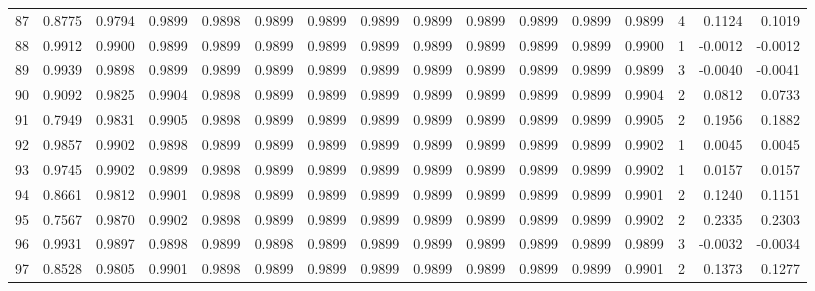 \begin{tabular}{lrrrrrrrrrrrrrrr}
87  &      0.8775 &  0.9794 &  0.9899 &  0.9898 &  0.9899 &  0.9899 &  0.9899 &  0.9899 &  0.9899 &  0.9899 &   0.9899 &     0.9899 &      4 &                    0.1124 &                     0.1019 \\
88  &      0.9912 &  0.9900 &  0.9899 &  0.9899 &  0.9899 &  0.9899 &  0.9899 &  0.9899 &  0.9899 &  0.9899 &   0.9899 &     0.9900 &      1 &                   -0.0012 &                    -0.0012 \\
89  &      0.9939 &  0.9898 &  0.9899 &  0.9899 &  0.9899 &  0.9899 &  0.9899 &  0.9899 &  0.9899 &  0.9899 &   0.9899 &     0.9899 &      3 &                   -0.0040 &                    -0.0041 \\
90  &      0.9092 &  0.9825 &  0.9904 &  0.9898 &  0.9899 &  0.9899 &  0.9899 &  0.9899 &  0.9899 &  0.9899 &   0.9899 &     0.9904 &      2 &                    0.0812 &                     0.0733 \\
91  &      0.7949 &  0.9831 &  0.9905 &  0.9898 &  0.9899 &  0.9899 &  0.9899 &  0.9899 &  0.9899 &  0.9899 &   0.9899 &     0.9905 &      2 &                    0.1956 &                     0.1882 \\
92  &      0.9857 &  0.9902 &  0.9898 &  0.9899 &  0.9899 &  0.9899 &  0.9899 &  0.9899 &  0.9899 &  0.9899 &   0.9899 &     0.9902 &      1 &                    0.0045 &                     0.0045 \\
93  &      0.9745 &  0.9902 &  0.9899 &  0.9898 &  0.9899 &  0.9899 &  0.9899 &  0.9899 &  0.9899 &  0.9899 &   0.9899 &     0.9902 &      1 &                    0.0157 &                     0.0157 \\
94  &      0.8661 &  0.9812 &  0.9901 &  0.9898 &  0.9899 &  0.9899 &  0.9899 &  0.9899 &  0.9899 &  0.9899 &   0.9899 &     0.9901 &      2 &                    0.1240 &                     0.1151 \\
95  &      0.7567 &  0.9870 &  0.9902 &  0.9898 &  0.9899 &  0.9899 &  0.9899 &  0.9899 &  0.9899 &  0.9899 &   0.9899 &     0.9902 &      2 &                    0.2335 &                     0.2303 \\
96  &      0.9931 &  0.9897 &  0.9898 &  0.9899 &  0.9898 &  0.9899 &  0.9899 &  0.9899 &  0.9899 &  0.9899 &   0.9899 &     0.9899 &      3 &                   -0.0032 &                    -0.0034 \\
97  &      0.8528 &  0.9805 &  0.9901 &  0.9898 &  0.9899 &  0.9899 &  0.9899 &  0.9899 &  0.9899 &  0.9899 &   0.9899 &     0.9901 &      2 &                    0.1373 &                     0.1277 \\

\end{tabular}
